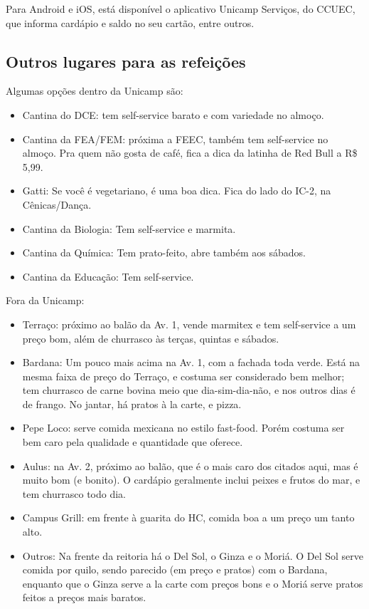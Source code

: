 Para Android e iOS, está disponível o aplicativo Unicamp Serviços, do CCUEC, que
informa cardápio e saldo no seu cartão, entre outros.

\subsection{Outros lugares para as refeições}

Algumas opções dentro da Unicamp são:

\begin{itemize}
\item Cantina do DCE: tem self-service barato e com variedade no almoço.
\item Cantina da FEA/FEM: próxima a FEEC, também tem self-service no almoço. Pra
  quem não gosta de café, fica a dica da latinha de Red Bull a R\$ 5,99.
\item Gatti: Se você é vegetariano, é uma boa dica. Fica do lado do IC-2, na
  Cênicas/Dança.
\item Cantina da Biologia: Tem self-service e marmita.
\item Cantina da Química:  Tem prato-feito, abre também aos sábados.
\item Cantina da Educação: Tem self-service.
\end {itemize}

Fora da Unicamp:

\begin{itemize}
\item Terraço: próximo ao balão da Av. 1, vende marmitex e tem self-service a um
  preço bom, além de churrasco às terças, quintas e sábados.
\item Bardana: Um pouco mais acima na Av. 1, com a fachada toda verde. Está na
  mesma faixa de preço do Terraço, e costuma ser considerado bem melhor; tem
  churrasco de carne bovina meio que dia-sim-dia-não, e nos outros dias é de
  frango. No jantar, há pratos à la carte, e pizza.
\item Pepe Loco: serve comida mexicana no estilo fast-food. Porém costuma ser
  bem caro pela qualidade e quantidade que oferece.
\item Aulus: na Av. 2, próximo ao balão, que é o mais caro dos citados aqui, mas
  é muito bom (e bonito). O cardápio geralmente inclui peixes e frutos do mar, e
  tem churrasco todo dia.
\item Campus Grill: em frente à guarita do HC, comida boa a um preço um tanto
  alto.
\item Outros: Na frente da reitoria há o Del Sol, o Ginza e o Moriá.  O Del Sol
  serve comida por quilo, sendo parecido (em preço e pratos) com o Bardana,
  enquanto que o Ginza serve a la carte com preços bons e o Moriá serve pratos
  feitos a preços mais baratos. 
\end{itemize}

